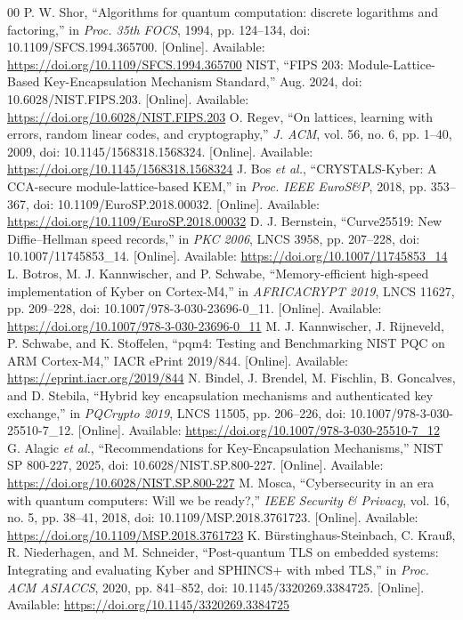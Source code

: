 \documentclass[journal, 10pt]{IEEEtran}
\begin{document}
\begin{thebibliography}{00}
\setlength{\itemsep}{0.5pt}
\setlength{\parskip}{0pt}
 P. W. Shor, ``Algorithms for quantum computation: discrete logarithms and factoring,'' in \textit{Proc. 35th FOCS}, 1994, pp. 124--134, doi: 10.1109/SFCS.1994.365700. [Online]. Available: \url{https://doi.org/10.1109/SFCS.1994.365700}
 NIST, ``FIPS 203: Module-Lattice-Based Key-Encapsulation Mechanism Standard,'' Aug. 2024, doi: 10.6028/NIST.FIPS.203. [Online]. Available: \url{https://doi.org/10.6028/NIST.FIPS.203}
 O. Regev, ``On lattices, learning with errors, random linear codes, and cryptography,'' \textit{J. ACM}, vol. 56, no. 6, pp. 1--40, 2009, doi: 10.1145/1568318.1568324. [Online]. Available: \url{https://doi.org/10.1145/1568318.1568324}
 J. Bos \textit{et al.}, ``CRYSTALS-Kyber: A CCA-secure module-lattice-based KEM,'' in \textit{Proc. IEEE EuroS\&P}, 2018, pp. 353--367, doi: 10.1109/EuroSP.2018.00032. [Online]. Available: \url{https://doi.org/10.1109/EuroSP.2018.00032}
 D. J. Bernstein, ``Curve25519: New Diffie--Hellman speed records,'' in \textit{PKC 2006}, LNCS 3958, pp. 207--228, doi: 10.1007/11745853\_14. [Online]. Available: \url{https://doi.org/10.1007/11745853_14}
 L. Botros, M. J. Kannwischer, and P. Schwabe, ``Memory-efficient high-speed implementation of Kyber on Cortex-M4,'' in \textit{AFRICACRYPT 2019}, LNCS 11627, pp. 209--228, doi: 10.1007/978-3-030-23696-0\_11. [Online]. Available: \url{https://doi.org/10.1007/978-3-030-23696-0_11}
 M. J. Kannwischer, J. Rijneveld, P. Schwabe, and K. Stoffelen, ``pqm4: Testing and Benchmarking NIST PQC on ARM Cortex-M4,'' IACR ePrint 2019/844. [Online]. Available: \url{https://eprint.iacr.org/2019/844}
 N. Bindel, J. Brendel, M. Fischlin, B. Goncalves, and D. Stebila, ``Hybrid key encapsulation mechanisms and authenticated key exchange,'' in \textit{PQCrypto 2019}, LNCS 11505, pp. 206--226, doi: 10.1007/978-3-030-25510-7\_12. [Online]. Available: \url{https://doi.org/10.1007/978-3-030-25510-7_12}
 G. Alagic \textit{et al.}, ``Recommendations for Key-Encapsulation Mechanisms,'' NIST SP 800-227, 2025, doi: 10.6028/NIST.SP.800-227. [Online]. Available: \url{https://doi.org/10.6028/NIST.SP.800-227}
 M. Mosca, ``Cybersecurity in an era with quantum computers: Will we be ready?,'' \textit{IEEE Security \& Privacy}, vol. 16, no. 5, pp. 38--41, 2018, doi: 10.1109/MSP.2018.3761723. [Online]. Available: \url{https://doi.org/10.1109/MSP.2018.3761723}
 K. B{\"u}rstinghaus-Steinbach, C. Krau{\ss}, R. Niederhagen, and M. Schneider, ``Post-quantum TLS on embedded systems: Integrating and evaluating Kyber and SPHINCS+ with mbed TLS,'' in \textit{Proc. ACM ASIACCS}, 2020, pp. 841--852, doi: 10.1145/3320269.3384725. [Online]. Available: \url{https://doi.org/10.1145/3320269.3384725}

\end{thebibliography}
\end{document}
